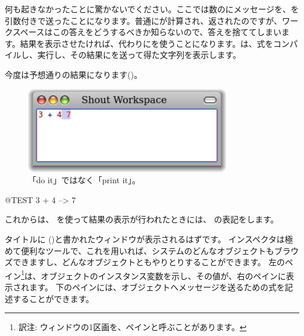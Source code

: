 \documentclass[a4paper,10pt,twoside]{book}
\begin{document}
何も起きなかったことに驚かないでください。ここでは数のに\ct{+}メッセージを、を引数付きで送ったことになります。普通にが計算され、返されたのですが、ワークスペースはこの答えをどうするべきか知らないので、答えを捨ててしまいます。結果を表示させたければ、代わりにを使うことになります。は、式をコンパイルし、実行し、その結果にを送って得た文字列を表示します。

今度は予想通りの結果になります()。

\begin{figure}[htb]
\centerline {\includegraphics[width=0.8\textwidth]{PrintIt}}
\caption{「do it」ではなく「print it」。}
\end{figure}

\begin{code}{@TEST}
3 + 4 --> 7
\end{code}
\noindent
これからは、 を使って結果の表示が行われたときには、\ct{-->} の表記をします。

\noindent
タイトルに ()と書かれたウィンドウが表示されるはずです。
インスペクタは極めて便利なツールで、これを用いれば、システムのどんなオブジェクトもブラウズできますし、どんなオブジェクトともやりとりすることができます。
左のペイン\footnote{訳注: ウィンドウの1区画を、ペインと呼ぶことがあります。}は、オブジェクトのインスタンス変数を示し、その値が、右のペインに表示されます。
下のペインには、オブジェクトへメッセージを送るための式を記述することができます。
\end{document}
